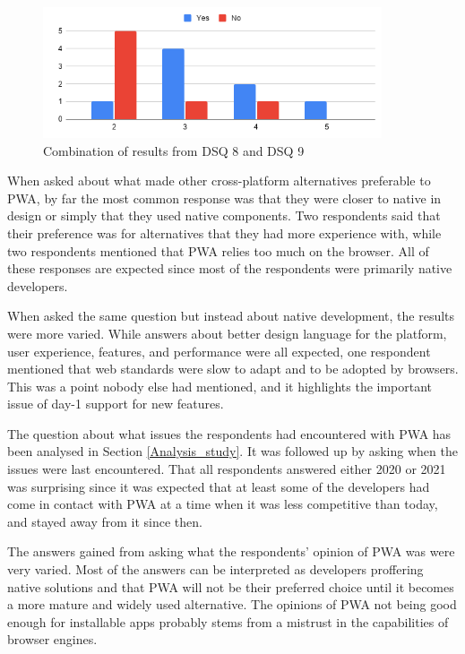 \documentclass[a4paper,12pt]{article}
\begin{document}
\begin{figure}[ht!]
    \centering
    \includegraphics[width=10cm]{img/Analysis/know.png}
    \caption{Combination of results from DSQ 8 and DSQ 9 }
    \label{fig:analysis_know}
\end{figure}
 
When asked about what made other cross-platform alternatives preferable to PWA, by far the most common response was that they were closer to native in design or simply that they used native components. Two respondents said that their preference was for alternatives that they had more experience with, while two respondents mentioned that PWA relies too much on the browser. All of these responses are expected since most of the respondents were primarily native developers.

When asked the same question but instead about native development, the results were more varied. While answers about better design language for the platform, user experience, features, and performance were all expected, one respondent mentioned that web standards were slow to adapt and to be adopted by browsers. This was a point nobody else had mentioned, and it highlights the important issue of day-1 support for new features.

The question about what issues the respondents had encountered with PWA has been analysed in Section \ref{Analysis_study}. It was followed up by asking when the issues were last encountered. That all respondents answered either 2020 or 2021 was surprising since it was expected that at least some of the developers had come in contact with PWA at a time when it was less competitive than today, and stayed away from it since then.

The answers gained from asking what the respondents' opinion of PWA was were very varied. Most of the answers can be interpreted as developers proffering native solutions and that PWA will not be their preferred choice until it becomes a more mature and widely used alternative. The opinions of PWA not being good enough for installable apps probably stems from a mistrust in the capabilities of browser engines.
\end{document}
